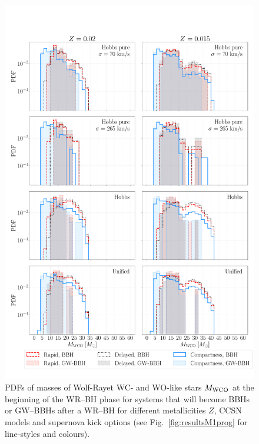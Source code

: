 \documentclass[a4paper,titlepage]{book}     	%
\begin{document}
\begin{figure}[h!]
	\centering
	\includegraphics[width=\textwidth]{./images/WRBH-MWRpureHe.pdf}	
	\caption{PDFs of masses of Wolf-Rayet WC- and WO-like stars $M_{\rm WCO}$ at the beginning of the WR--BH phase for systems that will become BBHs or GW--BBHs after a WR--BH for different metallicities $Z$, CCSN models and supernova kick options (see Fig.\ \ref{fig:resultsM1prog} for line-styles and colours).}\label{fig:resultsWRBH-MWRpureHe}
\end{figure}
\end{document}

